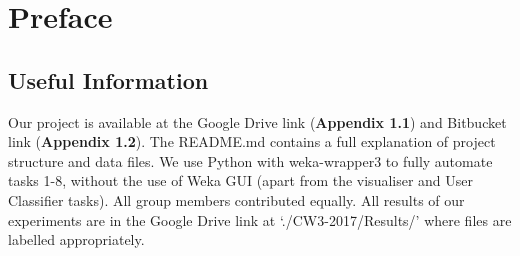 \section{Preface}

\subsection{Useful Information} 
Our project is available at the Google Drive link (\textbf{Appendix 1.1}) and Bitbucket link (\textbf{Appendix 1.2}). The README.md contains a full explanation of project structure and data files. We use Python with weka-wrapper3 to fully automate tasks 1-8, without the use of Weka GUI (apart from the visualiser and User Classifier tasks). All group members contributed equally. All results of our experiments are in the Google Drive link at `./CW3-2017/Results/' where files are labelled appropriately. 